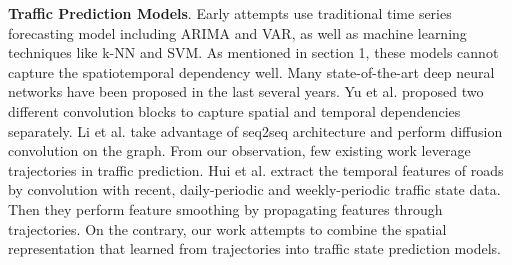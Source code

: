 \textbf{Traffic Prediction Models}. Early attempts use traditional time series forecasting model including ARIMA\cite{ARIMA_pred} and VAR\cite{var_pred}, as well as machine learning techniques like k-NN\cite{knn_pred} and SVM\cite{svm_pred}. As mentioned in section 1, these models cannot capture the spatiotemporal dependency well. Many state-of-the-art deep neural networks have been proposed in the last several years. Yu et al.\cite{STGCN} proposed two different convolution blocks to capture spatial and temporal dependencies separately. Li et al.\cite{DCRNN} take advantage of seq2seq\cite{seq2seq} architecture and perform diffusion convolution on the graph. From our observation, few existing work leverage trajectories in traffic prediction. Hui et al.\cite{trajnet} extract the temporal features of roads by convolution with recent, daily-periodic and weekly-periodic traffic state data. Then they perform feature smoothing by propagating features through trajectories. On the contrary, our work attempts to combine the spatial representation that learned from trajectories into traffic state prediction models.
